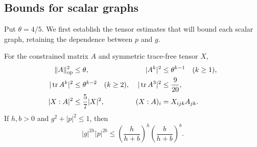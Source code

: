 \subsection{Bounds for scalar graphs}\label{cert:bounds}

Put $\theta=4/5$.  We first establish the tensor estimates that will bound
each scalar graph, retaining the dependence between $p$ and $g$.

\begin{lemma}\label{cert:tensor-bounds}
For the constrained matrix $A$ and symmetric trace-free tensor $X$,
\begin{align}
 \|A\|_{\mathrm{op}}^2&\le\theta,&
 |A^k|^2&\le\theta^{k-1}\quad(k\ge1),\label{cert:matrix-bounds}\\
 |\operatorname{tr} A^k|^2&\le\theta^{k-2}\quad(k\ge2),&
 |\operatorname{tr} A^3|^2&\le\frac9{20},\label{cert:trace-bounds}\\
 |X:A|^2&\le\frac57|X|^2,&
 (X:A)_i&=X_{ijk}A_{jk}.\label{cert:five-sevenths}
\end{align}
If $h,b>0$ and $g^2+|p|^2\le1$, then
\begin{equation}\label{cert:mixed-bound}
 |g|^{2h}|p|^{2b}
 \le \left(\frac{h}{h+b}\right)^h
       \left(\frac{b}{h+b}\right)^b.
\end{equation}
\end{lemma}
